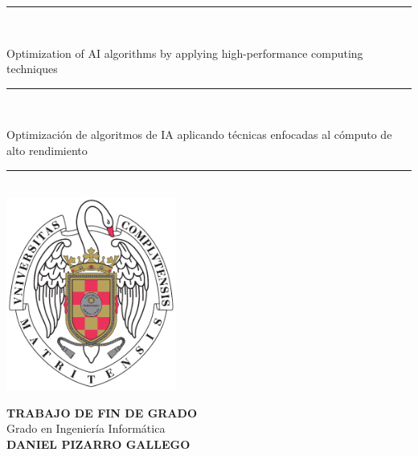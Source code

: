\begin{titlepage}
	\thispagestyle{empty}
	
	\begin{center}
		
		\vspace{1cm}
		
		\vspace{0.65cm}
		\rule{2in}{0.5pt}\\
		\vspace{0.85cm}
		
		{\Large Optimization of AI algorithms by applying high-performance computing techniques}\\
		
		\vspace{0.65cm}
		\rule{2in}{0.5pt}\\
		\vspace{0.85cm}
		
		{\Large Optimización de algoritmos de IA aplicando técnicas enfocadas al cómputo de alto rendimiento}\\
		
		\vspace{0.65cm}
		\rule{2in}{0.5pt}\\
		
		
		
		\vfill
		\includegraphics[height=2.5in]{images/escudo_ucm.pdf}
		\vfill
		
		
		
		\textbf{TRABAJO DE FIN DE GRADO}\\
		\vspace{0.35cm}
		Grado en Ingeniería Informática\\
		\vspace{0.35cm}
		\textbf{DANIEL PIZARRO GALLEGO}
		

\end{center}
\end{titlepage}
